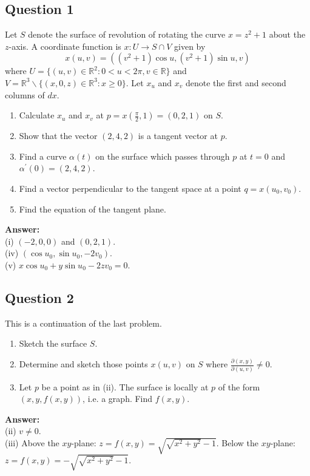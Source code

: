 \documentclass[12pt, a4paper]{article}
\newcommand{\R}{\mathbb{R}}
\begin{document}
\subsection*{Question 1}
Let $S$ denote the surface of revolution of rotating the curve $x=z^{2}+1$ about the $z$-axis. A coordinate function is $x: U\rightarrow S\cap V$ given by
\[ x(u,v)=((v^{2}+1)\cos u,(v^{2}+1)\sin u,v) \]
where $U=\{(u,v)\in\R^{2}:0<u<2\pi,v\in\R\}$ and $V=\R^{3}\backslash\{(x,0,z)\in\R^{3}:x\ge0\}$.
Let $x_{u}$ and $x_{v}$ denote the first and second columns of $dx$.
\begin{enumerate}[label=(\roman*)]
    \item Calculate $x_{u}$ and $x_{v}$ at $p=x(\frac{\pi}{2},1)=(0,2,1)$ on $S$.
    \item Show that the vector $(2, 4, 2)$ is a tangent vector at $p$.
    \item Find a curve $\alpha(t)$ on the surface which passes through $p$ at $t=0$ and $\alpha^{\prime}(0)=(2,4,2)$.
    \item Find a vector perpendicular to the tangent space at a point $q=x(u_{0},v_{0})$.
    \item Find the equation of the tangent plane.
\end{enumerate}

\vspace{1em}
\noindent\textbf{Answer:}\\
(i) $(-2,0,0)$ and $(0, 2, 1)$. \\
(iv) $(\cos u_{0},\sin u_{0},-2v_{0})$. \\
(v) $x\cos u_{0}+y\sin u_{0}-2zv_{0}=0$.
\newpage

\subsection*{Question 2}
This is a continuation of the last problem.
\begin{enumerate}[label=(\roman*)]
    \item Sketch the surface $S$.
    \item Determine and sketch those points $x(u,v)$ on $S$ where $\frac{\partial(x,y)}{\partial(u,v)}\ne0$.
    \item Let $p$ be a point as in (ii). The surface is locally at $p$ of the form $(x,y,f(x,y))$, i.e. a graph. Find $f(x,y)$.
\end{enumerate}

\vspace{1em}
\noindent\textbf{Answer:}\\
(ii) $v\ne0$. \\
(iii) Above the $xy$-plane: $z=f(x,y)=\sqrt{\sqrt{x^{2}+y^{2}}-1}$. Below the $xy$-plane: $z=f(x,y)=-\sqrt{\sqrt{x^{2}+y^{2}}-1}$.
\newpage
\end{document}
